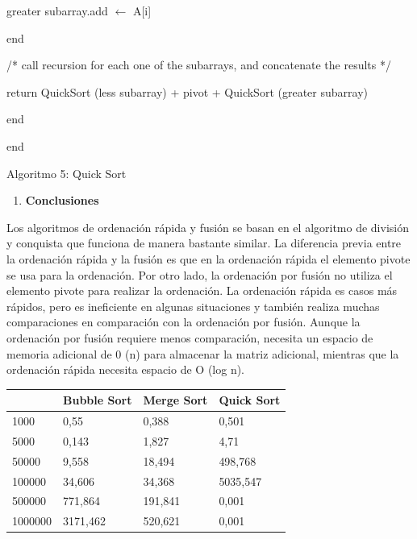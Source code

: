 ﻿\documentclass{article} %
\begin{document}
\noindent greater subarray.add $\mathrm{\leftarrow}$ A[i]

\noindent end

\noindent /* call recursion for each one of the subarrays, and concatenate the results */

\noindent return QuickSort (less subarray) + pivot + QuickSort (greater subarray)

\noindent end

\noindent end

\noindent Algoritmo 5: Quick Sort

\noindent 

\begin{enumerate}
\item  \textbf{Conclusiones}
\end{enumerate}

\noindent \textbf{}

\noindent Los algoritmos de ordenaci\'{o}n r\'{a}pida y fusi\'{o}n se basan en el algoritmo de divisi\'{o}n y conquista que funciona de manera bastante similar. La diferencia previa entre la ordenaci\'{o}n r\'{a}pida y la fusi\'{o}n es que en la ordenaci\'{o}n r\'{a}pida el elemento pivote se usa para la ordenaci\'{o}n. Por otro lado, la ordenaci\'{o}n por fusi\'{o}n no utiliza el elemento pivote para realizar la ordenaci\'{o}n. La ordenaci\'{o}n r\'{a}pida es casos m\'{a}s r\'{a}pidos, pero es ineficiente en algunas situaciones y tambi\'{e}n realiza muchas comparaciones en comparaci\'{o}n con la ordenaci\'{o}n por fusi\'{o}n. Aunque la ordenaci\'{o}n por fusi\'{o}n requiere menos comparaci\'{o}n, necesita un espacio de memoria adicional de 0 (n) para almacenar la matriz adicional, mientras que la ordenaci\'{o}n r\'{a}pida necesita espacio de O (log n).

\noindent \textbf{}

\begin{tabular}{|p{0.8in}|p{0.6in}|p{0.6in}|p{0.6in}|} \hline 
~ & Bubble Sort & Merge Sort & Quick Sort \\ \hline 
1000 & 0,55 & 0,388 & 0,501 \\ \hline 
5000 & 0,143 & 1,827 & 4,71 \\ \hline 
50000 & 9,558 & 18,494 & 498,768 \\ \hline 
100000 & 34,606 & 34,368 & 5035,547 \\ \hline 
500000 & 771,864 & 191,841 & 0,001 \\ \hline 
1000000 & 3171,462 & 520,621 & 0,001 \\ \hline 
\end{tabular}
\end{document}

